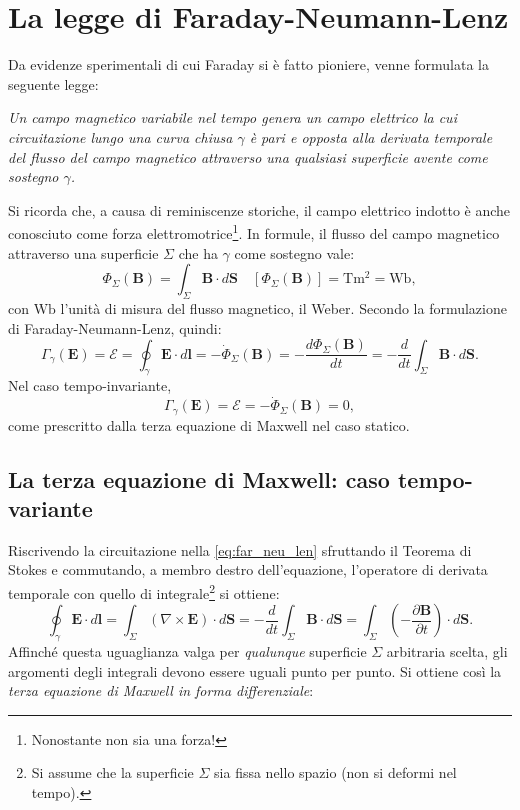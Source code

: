 \documentclass[a4paper,11pt]{report}
\begin{document}
\section{La legge di Faraday-Neumann-Lenz}
Da evidenze sperimentali di cui Faraday si è fatto pioniere, venne formulata la seguente legge:
\begin{center}
    \textit{Un campo magnetico variabile nel tempo genera un campo elettrico la cui circuitazione lungo una curva chiusa $\gamma$ è pari e opposta alla derivata temporale del flusso del campo magnetico attraverso una qualsiasi superficie avente come sostegno $\gamma$.}
\end{center}
Si ricorda che, a causa di reminiscenze storiche, il campo elettrico indotto è anche conosciuto come forza elettromotrice\footnote{Nonostante non sia una forza!}. In formule, il flusso del campo magnetico attraverso una superficie $\Sigma$ che ha $\gamma$ come sostegno vale:
\begin{equation}
\Phi_{\Sigma}(\bm{B}) = \int_{\Sigma} \bm{B} \cdot d\bm{S} \quad [\Phi_{\Sigma}(\bm{B})] = \si{\tesla\meter\squared} = \si{\weber},
\end{equation} 
con $\si{\weber}$ l'unità di misura del flusso magnetico, il Weber. Secondo la formulazione di Faraday-Neumann-Lenz, quindi:
\begin{equation}
\Gamma_{\gamma}(\bm{E}) = \mathcal{E} = \oint_\gamma \bm{E} \cdot d\bm{l} =  -\dot{\Phi}_{\Sigma}(\bm{B}) = -\frac{d \Phi_{\Sigma}(\bm{B})}{d t} = -\frac{d }{d t} \int_{\Sigma} \bm{B} \cdot d\bm{S}.
\label{eq:far_neu_len}
\end{equation} 
Nel caso tempo-invariante,
\begin{equation}
\Gamma_{\gamma}(\bm{E}) = \mathcal{E} = -\dot{\Phi}_{\Sigma}(\bm{B}) = 0,
\end{equation} 
come prescritto dalla terza equazione di Maxwell nel caso statico. 

\subsection{La terza equazione di Maxwell: caso tempo-variante}
Riscrivendo la circuitazione nella \eqref{eq:far_neu_len} sfruttando il Teorema di Stokes e commutando, a membro destro dell'equazione, l'operatore di derivata temporale con quello di integrale\footnote{Si assume che la superficie $\Sigma$ sia fissa nello spazio (non si deformi nel tempo).} si ottiene:
\begin{equation}
   \oint_\gamma \bm{E}\cdot d\bm{l} = \int_{\Sigma} (\nabla \times \bm{E}) \cdot d\bm{S} = -\frac{d }{d t} \int_{\Sigma} \bm{B} \cdot d\bm{S} = \int_{\Sigma} \left( -\frac{\partial \bm{B}}{\partial t} \right) \cdot d\bm{S}.
\end{equation}
Affinché questa uguaglianza valga per \textit{qualunque} superficie $\Sigma$ arbitraria scelta, gli argomenti degli integrali devono essere uguali punto per punto. Si ottiene così la \textit{terza equazione di Maxwell in forma differenziale}:
\end{document}
